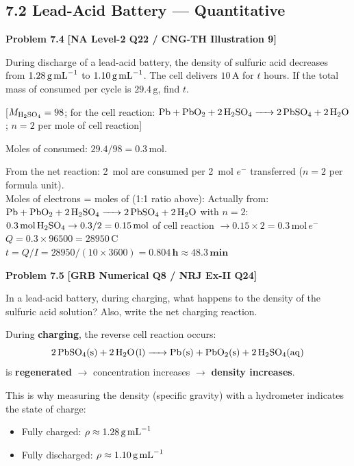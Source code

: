 \subsection{7.2 Lead-Acid Battery --- Quantitative}

\begin{problembox}
\textbf{Problem 7.4} \hfill \textbf{[NA Level-2 Q22 / CNG-TH Illustration 9]}

During discharge of a lead-acid battery, the density of sulfuric acid decreases from $1.28\,\text{g\,mL}^{-1}$ to $1.10\,\text{g\,mL}^{-1}$. The cell delivers $10\,\text{A}$ for $t$ hours. If the total mass of  consumed per cycle is $29.4\,\text{g}$, find $t$.

[$M_{\ce{H2SO4}} = 98$; for the cell reaction: $\ce{Pb + PbO2 + 2H2SO4 -> 2PbSO4 + 2H2O}$; $n=2$ per mole of cell reaction]
\end{problembox}
\begin{solution}
Moles of  consumed: $29.4/98 = 0.3\,\text{mol}$.

From the net reaction: 2~mol  are consumed per 2~mol $e^-$ transferred ($n=2$ per formula unit).\\
Moles of electrons = moles of  (1:1 ratio above):
Actually from: $\ce{Pb + PbO2 + 2H2SO4 -> 2PbSO4 + 2H2O}$ with $n=2$:
$0.3\,\text{mol}\,\ce{H2SO4} \to 0.3/2 = 0.15\,\text{mol}$ of cell reaction $\to 0.15 \times 2 = 0.3\,\text{mol}\,e^-$\\
$Q = 0.3 \times 96500 = 28950\,\text{C}$\\
$t = Q/I = 28950/(10 \times 3600) = \mathbf{0.804\,\text{h} \approx 48.3\,\text{min}}$
\end{solution}

\begin{problembox}
\textbf{Problem 7.5} \hfill \textbf{[GRB Numerical Q8 / NRJ Ex-II Q24]}

In a lead-acid battery, during charging, what happens to the density of the sulfuric acid solution? Also, write the net charging reaction.
\end{problembox}
\begin{solution}
During \textbf{charging}, the reverse cell reaction occurs:
\[\ce{2PbSO4(s) + 2H2O(l) -> Pb(s) + PbO2(s) + 2H2SO4(aq)}\]
 is \textbf{regenerated} $\to$ concentration increases $\to$ \textbf{density increases}.

This is why measuring the density (specific gravity) with a hydrometer indicates the state of charge:
\begin{itemize}
    \item Fully charged: $\rho \approx 1.28\,\text{g\,mL}^{-1}$
    \item Fully discharged: $\rho \approx 1.10\,\text{g\,mL}^{-1}$
\end{itemize}
\end{solution}


